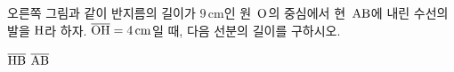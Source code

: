 \noindent\begin{minipage}[t]{0.58\linewidth}\vspace{0pt}\raggedright 오른쪽 그림과 같이 반지름의 길이가 $9\,\mathrm{cm}$인 원~$\mathrm{O}$의 중심에서 현~$\mathrm{AB}$에 내린 수선의 발을 $\mathrm{H}$라 하자. $\overline{\mathrm{OH}}=4\,\mathrm{cm}$일 때, 다음 선분의 길이를 구하시오.\end{minipage}\hfill\begin{minipage}[t]{0.4\linewidth}\vspace{0pt}\centering \resizebox{\ifdim\width>\linewidth\linewidth\else\width\fi}{!}{}\end{minipage}\par
{} $\overline{\mathrm{HB}}$
 $\overline{\mathrm{AB}}$
